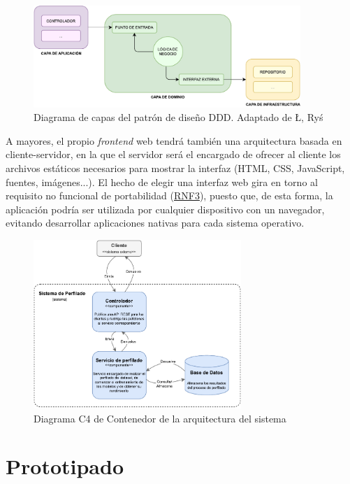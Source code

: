 \begin{figure}[H]
	\centering
	\includegraphics[width=0.9\textwidth]{diagramas/ddd.pdf}
	\caption{Diagrama de capas del patrón de diseño DDD. Adaptado de Ł, Ryś \cite{dddblog}}
	\label{fig:ddd}
\end{figure}

\bigskip
A mayores, el propio \textit{frontend} web tendrá también una arquitectura basada en cliente-servidor, en la que el servidor será el encargado
de ofrecer al cliente los archivos estáticos necesarios para mostrar la interfaz (HTML, CSS, JavaScript, fuentes, imágenes...). El hecho
de elegir una interfaz web gira en torno al requisito no funcional de portabilidad (\hyperref[req:rnf3]{RNF3}),
puesto que, de esta forma, la aplicación podría ser utilizada por cualquier dispositivo con un navegador, evitando
desarrollar aplicaciones nativas para cada sistema operativo.

\bigskip
\begin{figure}[H]
	\centering
	\includegraphics[width=0.7\textwidth]{diagramas/arquitectura_contenedor.pdf}
	\caption{Diagrama C4 de Contenedor de la arquitectura del sistema}
	\label{fig:arquitectura_contenedor}
\end{figure}

\section{Prototipado}
\label{sec:diseño_prototipado}


